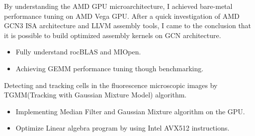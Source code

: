 \documentclass{resume}
\begin{document}
By understanding the AMD GPU microarchitecture, I achieved bare-metal performance tuning on AMD Vega GPU.
After a quick investigation of AMD GCN3 ISA architecture and LLVM assembly tools, I came to the conclusion that it is possible to build optimized assembly kernels on GCN architecture.
\begin{itemize}
    \item  Fully understand rocBLAS and MIOpen.
    \item Achieving GEMM performance tuning though benchmarking.
\end{itemize}

Detecting and tracking cells in the fluorescence microscopic images by TGMM(Tracking with Gaussian Mixture Model) algorithm.
\begin{itemize}
    \item Implementing Median Filter and Gaussian Mixture algorithm on the GPU.
    \item Optimize Linear algebra program by using Intel AVX512 instructions.
\end{itemize}
\end{document}

